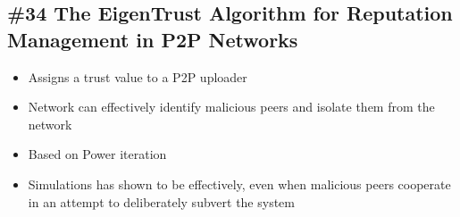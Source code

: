\subsection{\#34 The EigenTrust Algorithm for Reputation Management in P2P Networks}
\begin{itemize}
	\item Assigns a trust value to a P2P uploader
	\item Network can effectively identify malicious peers and isolate them from the network
	\item Based on Power iteration
	\item Simulations has shown to be effectively, even when malicious peers cooperate in an attempt to deliberately subvert the system
\end{itemize}